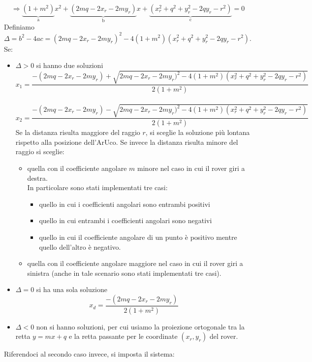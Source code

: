 \begin{equation*}
\Rightarrow \underbrace{(1+m^2)}_\text{a}x^2+\underbrace{(2mq-2x_r-2my_r)}_\text{b}x+\underbrace{(x_r^2+q^2+y_r^2-2qy_r-r^2)}_\text{c}=0
\end{equation*}
Definiamo $\Delta=b^2-4ac=(2mq-2x_r-2my_r)^2-4(1+m^2)(x_r^2+q^2+y_r^2-2qy_r-r^2)$. \\Se:
\begin{itemize}
    \item $\Delta>0$ si hanno due soluzioni
        \begin{equation}
        x_1=\frac{-(2mq-2x_r-2my_r)+\sqrt{2mq-2x_r-2my_r)^2-4(1+m^2)(x_r^2+q^2+y_r^2-2qy_r-r^2)}}{2(1+m^2)}
        \end{equation}
        \\
        \begin{equation}
        x_2=\frac{-(2mq-2x_r-2my_r)-\sqrt{2mq-2x_r-2my_r)^2-4(1+m^2)(x_r^2+q^2+y_r^2-2qy_r-r^2)}}{2(1+m^2)}
        \end{equation}
        Se la distanza risulta maggiore del raggio $r$, si sceglie la soluzione più lontana rispetto alla posizione dell'ArUco.
        Se invece la distanza risulta minore del raggio si sceglie: 
        \begin{itemize}
            \item quella con il coefficiente angolare $m$ minore nel caso in cui il rover giri a destra. \\In particolare sono stati implementati tre casi:
            \begin{itemize}
            \item quello in cui i coefficienti angolari sono entrambi positivi
            \item quello in cui entrambi i coefficienti angolari sono negativi
            \item quello in cui il coefficiente angolare di un punto è positivo mentre quello dell'altro è negativo.
            \end{itemize}
            \item quella con il coefficiente angolare maggiore nel caso in cui il rover giri a sinistra (anche in tale scenario sono stati implementati tre casi).
        \end{itemize}
    \item $\Delta=0$ si ha una sola soluzione
    \begin{equation}
        x_d=\frac{-(2mq-2x_r-2my_r)}{2(1+m^2)}
        \end{equation}
    \item $\Delta<0$ non si hanno soluzioni, per cui usiamo la proiezione ortogonale tra la retta $y=mx+q$ e la retta passante per le coordinate $(x_r, y_r)$ del rover.
\end{itemize}
Riferendoci al secondo caso invece, si imposta il sistema:

